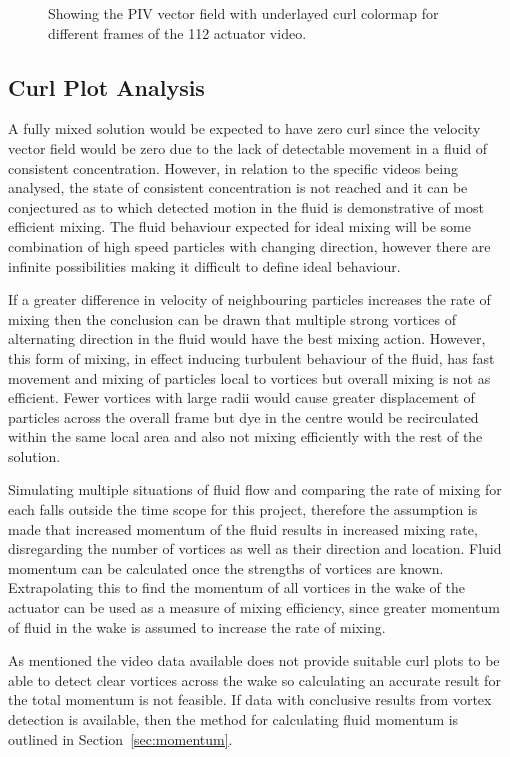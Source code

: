 \begin{figure}[H]
   
     \caption{Showing the PIV vector field with underlayed curl colormap for different frames of the 112 actuator video.}
      \label{fig:curl1}
     
\end{figure}

\subsection{Curl Plot Analysis}

A fully mixed solution would be expected to have zero curl since the velocity vector field would be zero due to the lack of detectable movement in a fluid of consistent concentration. However, in relation to the specific videos being analysed, the state of consistent concentration is not reached and it can be conjectured as to which detected motion in the fluid is demonstrative of most efficient mixing. The fluid behaviour expected for ideal mixing will be some combination of high speed particles with changing direction, however there are infinite possibilities making it difficult to define ideal behaviour.

If a greater difference in velocity of neighbouring particles increases the rate of mixing then the conclusion can be drawn that multiple strong vortices of alternating direction in the fluid would have the best mixing action. However, this form of mixing, in effect inducing turbulent behaviour of the fluid\cite{curl}, has fast movement and mixing of particles local to vortices but overall mixing is not as efficient. Fewer vortices with large radii would cause greater displacement of particles across the overall frame but dye in the centre would be recirculated within the same local area and also not mixing efficiently with the rest of the solution. 

Simulating multiple situations of fluid flow and comparing the rate of mixing for each falls outside the time scope for this project, therefore the assumption is made that increased momentum of the fluid results in increased mixing rate, disregarding the number of vortices as well as their direction and location. Fluid momentum can be calculated once the strengths of vortices are known. Extrapolating this to find the momentum of all vortices in the wake of the actuator can be used as a measure of mixing efficiency, since greater momentum of fluid in the wake is assumed to increase the rate of mixing.

As mentioned the video data available does not provide suitable curl plots to be able to detect clear vortices across the wake so calculating an accurate result for the total momentum is not feasible. If data with conclusive results from vortex detection is available, then the method for calculating fluid momentum is outlined in Section~\ref{sec:momentum}.


